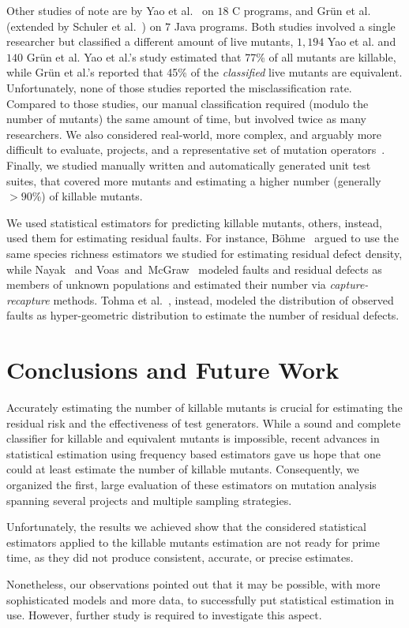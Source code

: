 \documentclass[sigconf]{acmart}
\begin{document}
Other studies of note are by Yao et al.~\cite{yao2014a} on $18$ C programs,
and Gr\"un et al.~\cite{grun2009impact} (extended by Schuler et al.~\cite{schuler2010covering})
on $7$ Java programs.
Both studies involved a single researcher but classified a different amount of live mutants,
$1,194$  Yao et al. and %
$140$ Gr\"un et al.
Yao et al.'s study 
estimated that 77\% of all mutants are killable, while Gr\"un et al.'s reported that 
45\% of the \emph{classified} live mutants are equivalent.
Unfortunately, none of those studies reported the misclassification rate.
Compared to those studies, 
our manual classification required (modulo the number of mutants) the same amount of time, 
but involved twice as many researchers. We also considered real-world, more complex, and arguably more
difficult to evaluate, projects, and a representative set of mutation operators~\cite{gopinath2017mutation}.
Finally, we studied manually written and automatically generated unit test suites, 
that covered more mutants and estimating a higher number (generally $> 90$\%) of killable mutants.

We used statistical estimators for predicting killable mutants, others, instead, used
them for estimating residual faults.
For instance, B{\"o}hme~\cite{bohme2018stads} argued to use the same
species richness estimators we studied for estimating residual defect density,
while Nayak~\cite{nayak1988estimating} and Voas~and~McGraw~\cite{voas1997software}
modeled faults and 
residual defects as members of unknown populations
and estimated their number via \emph{capture-recapture} methods.
Tohma et al.~\cite{tohma1989structural}, instead, modeled
the distribution of observed faults as hyper-geometric distribution
to estimate the number of residual defects.

\section{Conclusions and Future Work}
\label{sec:conclusions}
Accurately estimating the number of killable mutants is crucial for estimating
the residual risk and the effectiveness of test generators.
While a sound and complete classifier for killable and equivalent mutants is impossible,
recent advances in statistical estimation using frequency %
based estimators gave us hope that one could at least estimate the number of killable mutants.
Consequently, we organized the first, large evaluation of these estimators on mutation analysis spanning several projects and multiple sampling strategies.

Unfortunately, the results we achieved show that the considered statistical estimators %
applied to the killable mutants estimation are not ready for prime time, as they did not produce consistent, accurate, or precise estimates.

Nonetheless, our observations pointed out that it 
may be possible, with more sophisticated models and more data, to successfully put statistical estimation in use. 
However, further study is required to investigate this aspect.

\balance


\end{document}
